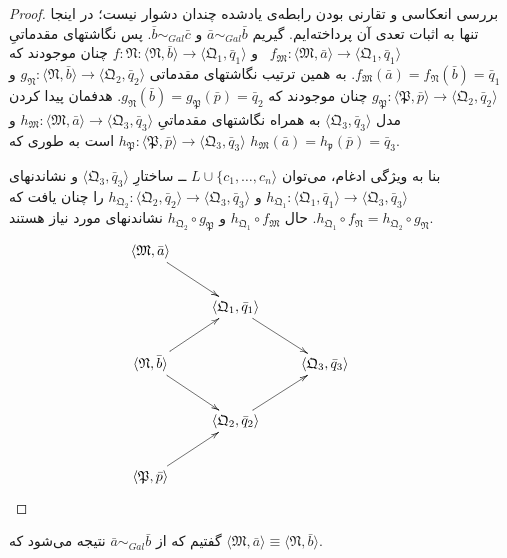 \documentclass[12pt,a4paper]{report}
\theoremstyle{colorhead}
\begin{document}
\begin{proof}
بررسی
انعکاسی و تقارنی بودن رابطه‌ی یادشده چندان دشوار نیست؛ در اینجا تنها به اثبات تعدی آن پرداخته‌ایم. گیریم
$\bar{a}\sim_{Gal}\bar{b}$
و
$\bar{b}\sim_{Gal} \bar{c}$.
پس نگاشتهای مقدماتیِ
\mbox{$f_\mathfrak{M}:\langle \mathfrak{M},\bar{a}\rangle \to \langle \mathfrak{Q}_1,\bar{q}_1\rangle$ }
و
$f:\mathfrak{N}:\langle\mathfrak{N},\bar{b}\rangle\to\langle \mathfrak{Q}_1,\bar{q}_1\rangle$
چنان موجودند که 
\mbox{$f_\mathfrak{M}(\bar{a})=f_\mathfrak{N}(\bar{b})=\bar{q}_1$}.
به همین ترتیب نگاشتهای مقدماتی
$g_\mathfrak{N}:\langle \mathfrak{N},\bar{b}\rangle\to \langle \mathfrak{Q}_2,\bar{q}_2\rangle$
و
$g_\mathfrak{P}:\langle\mathfrak{P},\bar{p}\rangle \to \langle \mathfrak{Q}_2,\bar{q}_2\rangle$
چنان موجودند
که 
$g_\mathfrak{N}(\bar{b})=g_\mathfrak{P}(\bar{p})=\bar{q}_2$.
هدفمان پیدا کردن مدل
$\langle\mathfrak{Q}_3,\bar{q}_3\rangle$
به همراه نگاشتهای مقدماتیِ
$h_\mathfrak{M}:\langle \mathfrak{M},\bar{a}\rangle\to \langle \mathfrak{Q}_3,\bar{q}_3\rangle$
و 
$h_\mathfrak{P}:\langle \mathfrak{P},\bar{p}\rangle\to\langle \mathfrak{Q}_3,\bar{q}_3\rangle$
است به طوری که
$h_\mathfrak{M}(\bar{a})=h_\mathfrak{p}(\bar{p})=\bar{q}_3$.
\par 
بنا به ویژگی ادغام، می‌توان
$L\cup \{c_1,\ldots,c_n\rangle$
ــ‌
ساختارِ 
$\langle \mathfrak{Q}_3,\bar{q}_3\rangle$
و نشاندنهای 
\mbox{$h_{\mathfrak{Q}_1}:\langle \mathfrak{Q}_1,\bar{q}_1\rangle\to
\langle \mathfrak{Q}_3,\bar{q}_3\rangle$}
و
$h_{\mathfrak{Q}_2}:\langle \mathfrak{Q}_2,\bar{q}_2\rangle\to
\langle \mathfrak{Q}_3,\bar{q}_3\rangle$
را چنان یافت که
\mbox{$h_{\mathfrak{Q}_1}\circ f_\mathfrak{N}=h_{\mathfrak{Q}_2}\circ g_\mathfrak{N}$}.
حال
$h_{\mathfrak{Q}_1}\circ f_\mathfrak{M}$
و
$h_{\mathfrak{Q}_2}\circ g_\mathfrak{P}$
نشاندنهای مورد نیاز هستند.
\begin{displaymath}
    \xymatrix{
        \langle \mathfrak{M},\bar{a}\rangle \ar[dr] & &  & \\
                & \langle \mathfrak{Q}_1,\bar{q}_1\rangle \ar[dr] &  & \\
        \langle \mathfrak{N},\bar{b}\rangle  \ar[ur]\ar[dr]&  & \langle \mathfrak{Q}_3,\bar{q}_3\rangle &  \\
          & \langle \mathfrak{Q}_2,\bar{q}_2\rangle \ar[ur]& &  \\
        \langle \mathfrak{P},\bar{p}\rangle \ar[ur] &  &  &  
       }
\end{displaymath}
\end{proof}
گفتیم که
از
$\bar{a}\sim_{Gal}\bar{b}$
نتیجه می‌شود که
$\langle \mathfrak{M},\bar{a}\rangle\equiv\langle \mathfrak{N},\bar{b}\rangle$.
\end{document}
